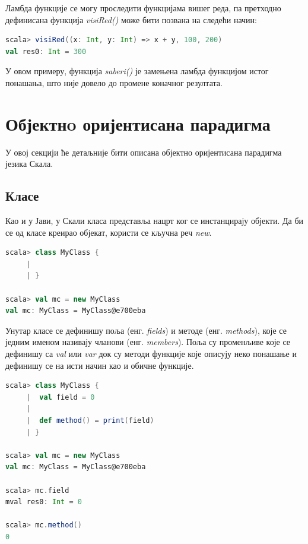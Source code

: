 \documentclass[12pt,oneside]{memoir}
\begin{document}
Ламбда функције се могу проследити функцијама вишег реда, па претходно дефинисана функција \textit{visiRed()} може бити позвана на следећи начин:

\begin{lstlisting}[language=Scala, caption={Прослеђивање ламбда функције другој функцији}, label={lst:scala_functions_lambda_high_order}]
scala> visiRed((x: Int, y: Int) => x + y, 100, 200)
val res0: Int = 300
\end{lstlisting}

У овом примеру, функција \textit{saberi()} је замењена ламбда функцијом истог понашања, што није довело до промене коначног резултата. 

\section{Објектнo оријентисана парадигма}
\label{sec:scala_oop}

У овој секцији ће детаљније бити описана објектно оријентисана парадигма језика Скала. 

\subsection{Класе}
\label{subsec:scala_klase}

Као и у Јави, у Скали класа представља нацрт ког се инстанцирају објекти. Да би се од класе креирао објекат, користи се кључна реч \textit{new}.

\begin{lstlisting}[language=Scala, caption={Дефиниција и инстанцирање класе у Скали}, label={lst:scala_oop_class_instance}]
scala> class MyClass {
     |     
     | }

scala> val mc = new MyClass
val mc: MyClass = MyClass@e700eba
\end{lstlisting}

Унутар класе се дефинишу поља (енг. \textit{fields}) и методе (енг. \textit{methods}), које се једним именом називају чланови (енг. \textit{members}). Поља су променљиве које се дефинишу са \textit{val} или \textit{var} док су методи функције које описују неко понашање и дефинишу се на исти начин као и обичне функције. \cite{scala_prog}

\begin{lstlisting}[language=Scala, caption={Чланови класе}, label={lst:scala_oop_members_class}]
scala> class MyClass {
     |  val field = 0
     |  
     |  def method() = print(field)
     | }

scala> val mc = new MyClass
val mc: MyClass = MyClass@e700eba

scala> mc.field
mval res0: Int = 0

scala> mc.method()
0
\end{lstlisting}
\end{document}
